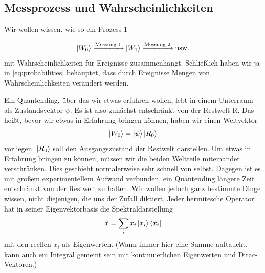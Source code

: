\documentclass[12pt]{book}
\begin{document}
\subsection{Messprozess und Wahrscheinlichkeiten}

Wir wollen wissen, wie so ein Prozess 1 

\begin{equation} \label{eq:probabilities_qm}
\ket{W_0} \xrightarrow{\textrm{Messung 1}} 
\ket{W_1} \xrightarrow{\textrm{Messung 2}}  \textrm{usw.}
\end{equation}
mit Wahrscheinlichkeiten für Ereignisse zusammenhängt. Schließlich haben wir ja in \ref{eq:probabilities} behauptet, dass durch Ereignisse Mengen von Wahrscheinlichkeiten verändert werden. 

Ein Quantending, über das wir etwas erfahren wollen, lebt in einem Unterraum als Zustandsvektor $\psi$. Es ist also zunächst entschränkt von der Restwelt R. Das heißt, bevor wir etwas in Erfahrung bringen können, haben wir einen Weltvektor
\begin{equation}
\ket{W_0} = \ket{\psi}\ket{R_0}
\end{equation} 
vorliegen. $\ket{R_0}$ soll den Ausgangszustand der Restwelt darstellen. Um etwas in Erfahrung bringen zu können, müssen wir die beiden Weltteile miteinander verschränken. Dies geschieht normalerweise sehr schnell von selbst. Dagegen ist es mit großem experimentellem Aufwand verbunden, ein Quantending längere Zeit entschränkt von der Restwelt zu halten. Wir wollen jedoch ganz bestimmte Dinge wissen, nicht diejenigen, die uns der Zufall diktiert. Jeder hermitesche Operator hat in seiner Eigenvektorbasis die Spektraldarstellung
\begin{equation}
\hat{x} = \sum_i x_i \ket{x_i}\bra{x_i}
\end{equation} 
mit den reellen $x_i$ als Eigenwerten. (Wann immer hier eine Summe auftaucht, kann auch ein Integral gemeint sein mit kontinuierlichen Eigenwerten und Dirac-Vektoren.)
\end{document}
